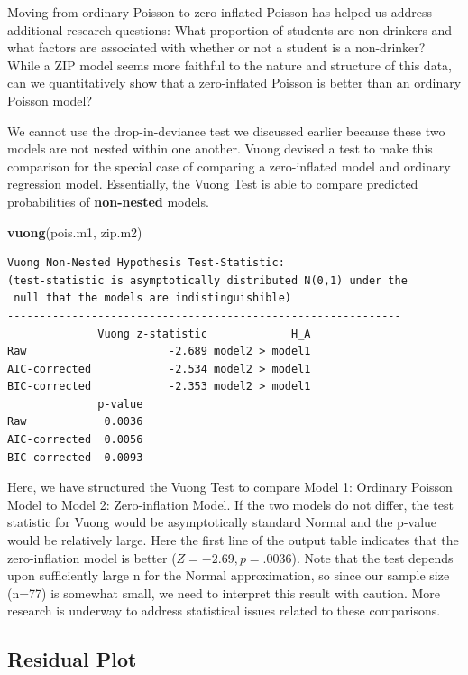 \documentclass[
]{krantz}
\newenvironment{Shaded}{\begin{snugshade}}{\end{snugshade}}
\newcommand{\KeywordTok}[1]{\textcolor[rgb]{0.27,0.27,0.27}{\textbf{#1}}}
\newcommand{\NormalTok}[1]{#1}
\begin{document}
Moving from ordinary Poisson to zero-inflated Poisson has helped us address additional research questions: What proportion of students are non-drinkers and what factors are associated with whether or not a student is a non-drinker? While a ZIP model seems more faithful to the nature and structure of this data, can we quantitatively show that a zero-inflated Poisson is better than an ordinary Poisson model?

We cannot use the drop-in-deviance test we discussed earlier because these two models are not nested within one another. Vuong \citeyearpar{Vuong1989} devised a test to make this comparison for the special case of comparing a zero-inflated model and ordinary regression model. Essentially, the Vuong Test  is able to compare predicted probabilities of \textbf{non-nested} models.

\begin{Shaded}
\begin{Highlighting}[]
\KeywordTok{vuong}\NormalTok{(pois.m1, zip.m2)}
\end{Highlighting}
\end{Shaded}

\begin{verbatim}
Vuong Non-Nested Hypothesis Test-Statistic: 
(test-statistic is asymptotically distributed N(0,1) under the
 null that the models are indistinguishible)
-------------------------------------------------------------
              Vuong z-statistic             H_A
Raw                      -2.689 model2 > model1
AIC-corrected            -2.534 model2 > model1
BIC-corrected            -2.353 model2 > model1
              p-value
Raw            0.0036
AIC-corrected  0.0056
BIC-corrected  0.0093
\end{verbatim}

Here, we have structured the Vuong Test to compare Model 1: Ordinary Poisson Model to Model 2: Zero-inflation Model. If the two models do not differ, the test statistic for Vuong would be asymptotically standard Normal and the p-value would be relatively large. Here the first line of the output table indicates that the zero-inflation model is better (\(Z=-2.69,p=.0036\)). Note that the test depends upon sufficiently large n for the Normal approximation, so since our sample size (n=77) is somewhat small, we need to interpret this result with caution. More research is underway to address statistical issues related to these comparisons.

\hypertarget{residual-plot}{%
\subsection{Residual Plot}\label{residual-plot}}
\end{document}
